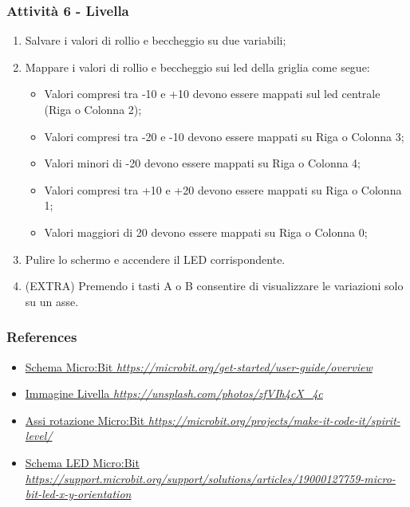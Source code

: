\documentclass{beamer}
\begin{document}
\begin{frame}
	\frametitle{Attività 6 - Livella}

	\begin{enumerate}
		\item Salvare i valori di rollio e beccheggio su due variabili;
		\item Mappare i valori di rollio e beccheggio sui led della griglia come segue:
		\begin{itemize}
			\item Valori compresi tra -10 e +10 devono essere mappati sul led centrale (Riga o Colonna 2);
			\item Valori compresi tra -20 e -10 devono essere mappati su Riga o Colonna 3;
			\item Valori minori di -20 devono essere mappati su Riga o Colonna 4;
			\item Valori compresi tra +10 e +20 devono essere mappati su Riga o Colonna 1;
			\item Valori maggiori di 20 devono essere mappati su Riga o Colonna 0;
		\end{itemize}
		\item Pulire lo schermo e accendere il LED corrispondente.
		\item (EXTRA) Premendo i tasti A o B consentire di visualizzare le variazioni solo su un asse.
	\end{enumerate}

	

\end{frame}

\begin{frame}
	\frametitle{References}
	\begin{itemize}
		\item \href{https://microbit.org/get-started/user-guide/overview/}{Schema Micro:Bit \textit{https://microbit.org/get-started/user-guide/overview}}
		\item \href{https://unsplash.com/photos/zfVIh4cX_4c}{Immagine Livella \textit{https://unsplash.com/photos/zfVIh4cX\_4c}} 
		\item \href{https://microbit.org/projects/make-it-code-it/spirit-level/}{Assi rotazione Micro:Bit \textit{https://microbit.org/projects/make-it-code-it/spirit-level/}}
		\item \href{https://support.microbit.org/support/solutions/articles/19000127759-micro-bit-led-x-y-orientation}{Schema LED Micro:Bit \textit{https://support.microbit.org/support/solutions/articles/19000127759-micro-bit-led-x-y-orientation}}
	\end{itemize}
\end{frame}
\end{document}
